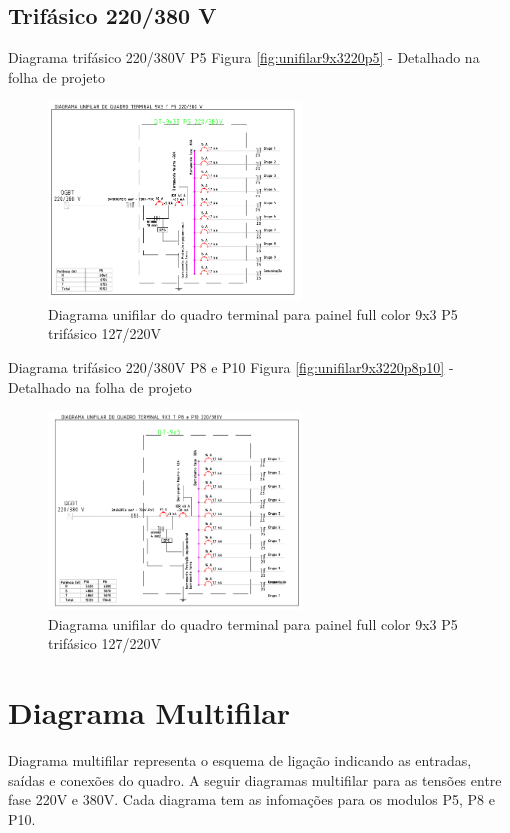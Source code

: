 \subsection{Trifásico 220/380 V}
Diagrama trifásico 220/380V P5 Figura \ref{fig:unifilar9x3220p5} - Detalhado na folha de projeto
\begin{figure}[h]
    \centering
    \includegraphics[width=0.6\textwidth]{image/DU9X3T380P5.png}
    \caption{Diagrama unifilar do quadro terminal para painel full color 9x3 P5 trifásico 127/220V}
   \label{fig:unifilar9x33800p5}
\end{figure}
Diagrama trifásico 220/380V P8 e P10 Figura \ref{fig:unifilar9x3220p8p10} - Detalhado na folha de projeto
\begin{figure}[h]
    \centering
    \includegraphics[width=0.6\textwidth]{image/DU9X3T380P8P10.png}
    \caption{Diagrama unifilar do quadro terminal para painel full color 9x3 P5 trifásico 127/220V}
   \label{fig:unifilar9x33800p8p10}
\end{figure}

\section{Diagrama Multifilar}
Diagrama multifilar representa o esquema de ligação indicando as entradas, saídas e conexões do quadro. A seguir diagramas multifilar para as tensões entre fase 220V e 380V. Cada diagrama tem as infomações para os modulos P5, P8 e P10.
